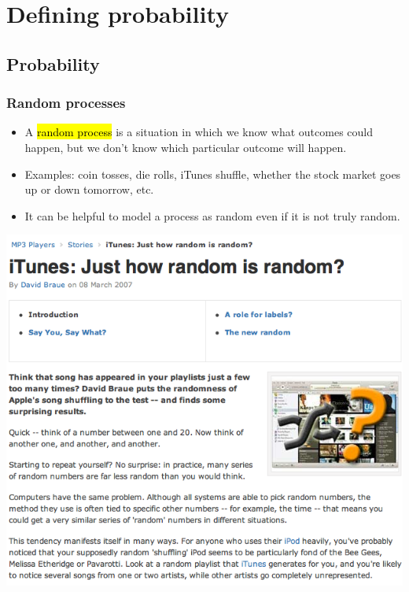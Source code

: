 \section{Defining probability}


\subsection{Probability}


\begin{frame}
\frametitle{Random processes}

{
\begin{itemize}

\item A \hl{random process} is a situation in which we know what outcomes could happen, but we don't know which particular outcome will happen.

\item Examples: coin tosses, die rolls, iTunes shuffle, whether the stock market goes up or down tomorrow, etc.

\item It can be helpful to model a process as random even if it is not truly random.

\end{itemize}
}{
\begin{center}
\includegraphics[width=\textwidth]{2-1_define_probability/figures/iTunes}
\end{center}
}

\end{frame}

